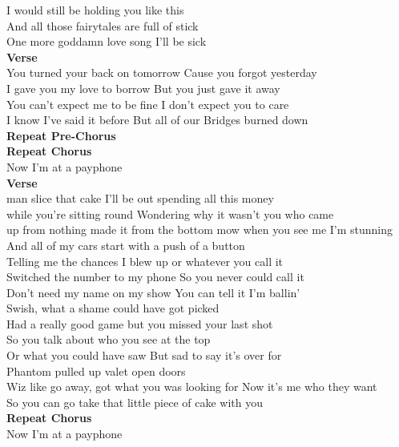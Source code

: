 I would still be holding you like this\\
And all those fairytales are full of stick\\
One more goddamn love song I'll be sick\\
\textbf{Verse}\\
 You turned your back on tomorrow Cause you forgot yesterday\\
I gave you my love to borrow But you just gave it away\\
You can't expect me to be fine  I don't expect you to care\\
I know I've said it before But all of our Bridges burned down\\
\textbf{Repeat Pre-Chorus}\\
\textbf{Repeat Chorus}\\
Now I'm at a payphone\\
\textbf{Verse}\\
man slice that cake I'll be out spending all this money\\
while you're sitting round Wondering why it wasn't you who came \\
up from nothing made it from the bottom mow when you see me I'm stunning\\
And all of my cars start with a push of a button\\
Telling me the chances I blew up or whatever you call it\\
Switched the number to my phone So you never could call it\\
Don't need my name on my show You can tell it I'm ballin'\\
Swish, what a shame could have got picked\\
Had a really good game but you missed your last shot\\
So you talk about who you see at the top\\
Or what you could have saw But sad to say it's over for\\
Phantom pulled up valet open doors\\
Wiz like go away, got what you was looking for Now it's me who they want\\
So you can go take that little piece of cake with you\\
\textbf{Repeat Chorus}\\
Now I'm at a payphone\\

